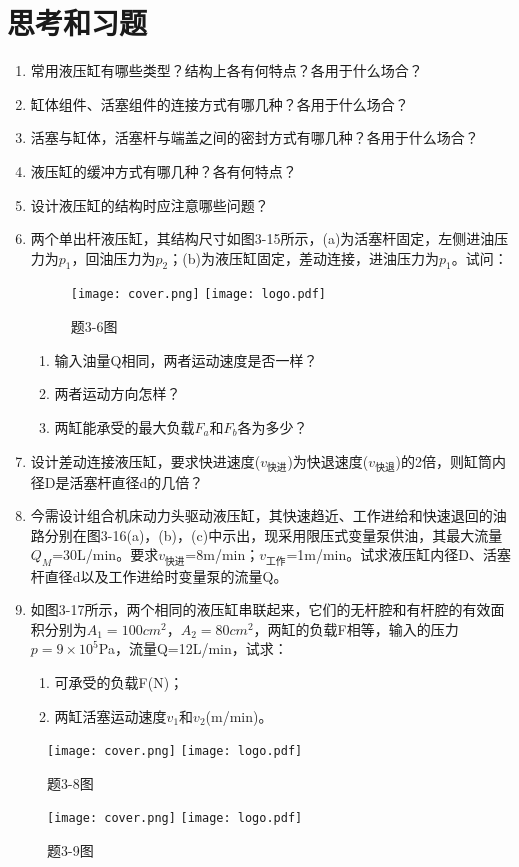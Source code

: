 \section*{思考和习题}
\begin{enumerate}[\hspace{2em}3-1]
 \item 常用液压缸有哪些类型？结构上各有何特点？各用于什么场合？
 \item 缸体组件、活塞组件的连接方式有哪几种？各用于什么场合？
 \item 活塞与缸体，活塞杆与端盖之间的密封方式有哪几种？各用于什么场合？
 \item 液压缸的缓冲方式有哪几种？各有何特点？
 \item 设计液压缸的结构时应注意哪些问题？
 \item 两个单出杆液压缸，其结构尺寸如图3-15所示，(a)为活塞杆固定，左侧进油压力为$p_1$，回油压力为$p_2$；(b)为液压缸固定，差动连接，进油压力为$p_1$。试问：
\begin{figure}[htbp]
\centering
\ifOpenSource
\texttt{[image: cover.png]}
\else
\texttt{[image: logo.pdf]}
\fi
\caption{题3-6图}
\label{logo}
\end{figure}
  \begin{enumerate}[\hspace{2em}(1)]
   \item 输入油量Q相同，两者运动速度是否一样？
   \item 两者运动方向怎样？
   \item 两缸能承受的最大负载$F_a$和$F_b$各为多少？
  \end{enumerate}
 \item 设计差动连接液压缸，要求快进速度($v_{\text {快进}}$)为快退速度($v_{\text {快退}}$)的2倍，则缸筒内径D是活塞杆直径d的几倍？
 \item 今需设计组合机床动力头驱动液压缸，其快速趋近、工作进给和快速退回的油路分别在图3-16(a)，(b)，(c)中示出，现采用限压式变量泵供油，其最大流量$Q_M$=30L/min。要求$v_{\text {快进}}$=8m/min；$v_{\text {工作}}$=1m/min。试求液压缸内径D、活塞杆直径d以及工作进给时变量泵的流量Q。
 \item 如图3-17所示，两个相同的液压缸串联起来，它们的无杆腔和有杆腔的有效面积分别为$A_1=100cm^2$，$A_2=80cm^2$，两缸的负载F相等，输入的压力$p=9\times10^5$Pa，流量Q=12L/min，试求：
  \begin{enumerate}[\hspace{2em}(1)]
   \item 可承受的负载F(N)；
   \item 两缸活塞运动速度$v_1$和$v_2$(m/min)。
  \end{enumerate}
\end{enumerate}
\begin{figure}[htbp]
\centering
\ifOpenSource
\texttt{[image: cover.png]}
\else
\texttt{[image: logo.pdf]}
\fi
\caption{题3-8图}
\label{logo}
\end{figure}
\begin{figure}[htbp]
\centering
\ifOpenSource
\texttt{[image: cover.png]}
\else
\texttt{[image: logo.pdf]}
\fi
\caption{题3-9图}
\label{logo}
\end{figure}


